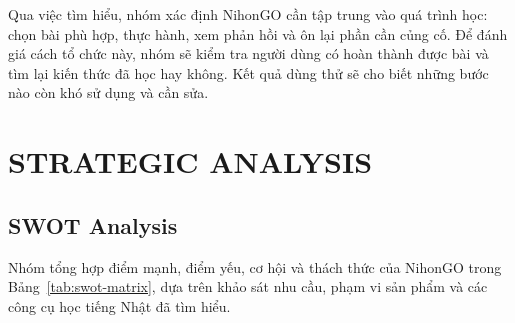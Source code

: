 Qua việc tìm hiểu, nhóm xác định NihonGO cần tập trung vào quá trình học: chọn bài phù hợp, thực hành, xem phản hồi và ôn lại phần cần củng cố. Để đánh giá cách tổ chức này, nhóm sẽ kiểm tra người dùng có hoàn thành được bài và tìm lại kiến thức đã học hay không. Kết quả dùng thử sẽ cho biết những bước nào còn khó sử dụng và cần sửa.

\section{STRATEGIC ANALYSIS}

\subsection{SWOT Analysis}

Nhóm tổng hợp điểm mạnh, điểm yếu, cơ hội và thách thức của NihonGO trong Bảng~\ref{tab:swot-matrix}, dựa trên khảo sát nhu cầu, phạm vi sản phẩm và các công cụ học tiếng Nhật đã tìm hiểu.

